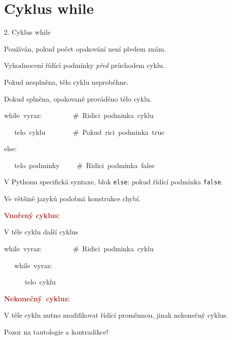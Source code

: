 \documentclass[czech]{beamer}
\newenvironment{lyxcode}
  {\par\begin{list}{}{
    \setlength{\rightmargin}{\leftmargin}
    \setlength{\listparindent}{0pt}%
    \raggedright
    \setlength{\itemsep}{0pt}
    \setlength{\parsep}{0pt}
    \normalfont\ttfamily}%
   \def\{{\char`\{}
   \def\}{\char`\}}
   \def\textasciitilde{\char`\~}
   \item[]}
  {\end{list}}
\begin{document}
\section{Cyklus while}
\begin{frame}[plain]{2. Cyklus while}

{\scriptsize Používán, pokud počet opakování není předem znám.}{\scriptsize\par}

{\scriptsize Vyhodnocení řídící podmínky }{\scriptsize\emph{před}}{\scriptsize{}
průchodem cyklu. \bigskip{}
}{\scriptsize\par}

{\scriptsize Pokud nesplněna, tělo cyklu neproběhne. \bigskip{}
}{\scriptsize\par}

{\scriptsize Dokud splněna, opakovaně prováděno tělo cyklu.\medskip{}
}{\scriptsize\par}
\begin{lyxcode}
{\scriptsize while~vyraz:~~~~~~~~~\#~Ridici~podminka~cyklu}{\scriptsize\par}

{\scriptsize ~~~telo~cyklu~~~~~~~~\#~Pokud~rici~podminka~true}{\scriptsize\par}

{\scriptsize else:}{\scriptsize\par}

{\scriptsize ~~~telo~podminky~~~~~\#~Ridici~podminka~false}{\scriptsize\par}
\end{lyxcode}
{\scriptsize\medskip{}
V Pythonu specifická syntaxe, blok }{\scriptsize\texttt{else}}{\scriptsize :
pokud řídící podmínka }{\scriptsize\texttt{false}}{\scriptsize .}{\scriptsize\par}

{\scriptsize Ve většině jazyků podobná konstrukce chybí.\bigskip{}
}{\scriptsize\par}

{\scriptsize\textbf{\textcolor{brown}{Vnořený cyklus:}}}{\scriptsize\par}

{\scriptsize V těle cyklu další cyklus}{\scriptsize\par}
\begin{lyxcode}
{\scriptsize while~vyraz:~~~~~~~~~\#~Ridici~podminka~cyklu}{\scriptsize\par}

{\scriptsize ~~~while~vyraz:~}{\scriptsize\par}

{\scriptsize ~~~~~~telo~cyklu}{\scriptsize\par}
\end{lyxcode}
{\scriptsize\textbf{\textcolor{brown}{Nekonečný~cyklus:}}}{\scriptsize\par}

{\scriptsize V těle cyklu nutno modifikovat řídící proměnnou, jinak
nekonečný cyklus.}{\scriptsize\par}

{\scriptsize Pozor na tautologie a kontradikce!}{\scriptsize\par}
\end{frame}
\end{document}
